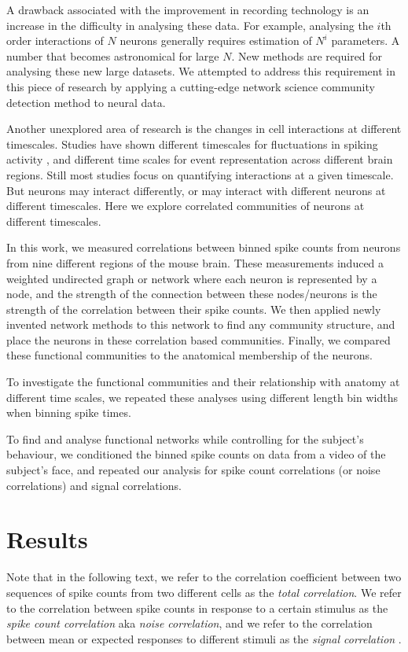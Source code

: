 A drawback associated with the improvement in recording technology is an increase in the difficulty in analysing these data. For example, analysing the $i$th order interactions of $N$ neurons generally requires estimation of $N^i$ parameters. A number that becomes astronomical for large $N$. New methods are required for analysing these new large datasets. We attempted to address this requirement in this piece of research by applying a cutting-edge network science community detection method to neural data.

Another unexplored area of research is the changes in cell interactions at different timescales. Studies have shown different timescales for fluctuations in spiking activity \parencite{murray}, and different time scales for event representation \parencite{baldassano} across different brain regions. Still most studies focus on quantifying interactions at a given timescale. But neurons may interact differently, or may interact with different neurons at different timescales. Here we explore correlated communities of neurons at different timescales.

In this work, we measured correlations between binned spike counts from neurons from nine different regions of the mouse brain. These measurements induced a weighted undirected graph or network where each neuron is represented by a node, and the strength of the connection between these nodes/neurons is the strength of the correlation between their spike counts. We then applied newly invented network methods \parencite{humphries} to this network to find any community structure, and place the neurons in these correlation based communities. Finally, we compared these functional communities to the anatomical membership of the neurons.

To investigate the functional communities and their relationship with anatomy at different time scales, we repeated these analyses using different length bin widths when binning spike times.

To find and analyse functional networks while controlling for the subject's behaviour, we conditioned the binned spike counts on data from a video of the subject's face, and repeated our analysis for spike count correlations (or noise correlations) and signal correlations.

\section{Results}

Note that in the following text, we refer to the correlation coefficient between two sequences of spike counts from two different cells as the \textit{total correlation}. We refer to the correlation between spike counts in response to a certain stimulus as the \textit{spike count correlation} aka \textit{noise correlation}, and we refer to the correlation between mean or expected responses to different stimuli as the \textit{signal correlation} \parencite{cohen2}.

